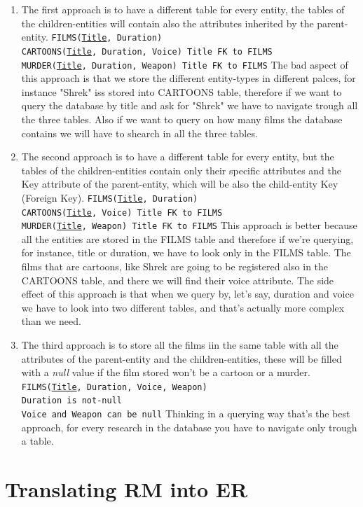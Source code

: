 \documentclass[class=book, crop=false, oneside]{standalone}
\begin{document}
\begin{enumerate}
	\item The first approach is to have a different table for every entity, the tables of the children-entities will contain also the attributes inherited by the parent-entity.
	\vskip 5pt
	\texttt{FILMS(\underline{Title}, Duration)}\\
	\texttt{CARTOONS(\underline{Title}, Duration, Voice)   Title FK to FILMS}\\
	\texttt{MURDER(\underline{Title}, Duration, Weapon)   Title FK to FILMS}
	\vskip 5pt
	The bad aspect of this approach is that we store the different entity-types in different palces, for instance "Shrek" iss stored into CARTOONS table, therefore if we want to query the database by title and ask for "Shrek" we have to navigate trough all the three tables. Also if we want to query on how many films the database contains we will have to shearch in all the three tables.
	\item The second approach is to have a different table for every entity, but the tables of the children-entities contain only their specific attributes and the Key attribute of the parent-entity, which will be also the child-entity Key (Foreign Key).
	\vskip 5pt
	\texttt{FILMS(\underline{Title}, Duration)}\\
	\texttt{CARTOONS(\underline{Title}, Voice)   Title FK to FILMS}\\
	\texttt{MURDER(\underline{Title}, Weapon)   Title FK to FILMS}
	\vskip 5pt
	This approach is better because all the entities are stored in the FILMS table and therefore if we're querying, for instance, title or duration, we have to look only in the FILMS table. The films that are cartoons, like Shrek are going to be registered also in the CARTOONS table, and there we will find their voice attribute.
	The side effect of this approach is that when we query by, let's say, duration and voice we have to look into two different tables, and that's actually more complex than we need.
	\item The third approach is to store all the films iin the same table with all the attributes of the parent-entity and the children-entities, these will be filled with a \emph{null} value if the film stored won't be a cartoon or a murder.
	\vskip 5pt
	\texttt{FILMS(\underline{Title}, Duration, Voice, Weapon)}\\
	\texttt{Duration is not-null}\\
	\texttt{Voice and Weapon can be null}
	\vskip 5pt
	Thinking in a querying way that's the best approach, for every research in the database you have to navigate only trough a table.
\end{enumerate}

\chapter{Translating RM into ER}
\end{document}
